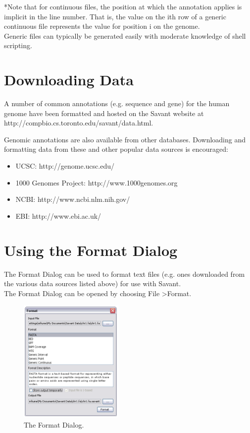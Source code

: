 \documentclass{report}
\begin{document}
*Note that for continuous files, the position at which the annotation applies is implicit in the line number. That is, the value on the ith row of a generic continuous file represents the value for position i on the genome. \\

Generic files can typically be generated easily with moderate knowledge of shell scripting.  

\section{Downloading Data}

A number of common annotations (e.g. sequence and gene) for the human genome have been formatted and hosted on the Savant website at http://compbio.cs.toronto.edu/savant/data.html.

Genomic annotations are also available from other databases. Downloading and formatting data from these and other popular data sources is encouraged:

\begin{itemize}
\item UCSC: http://genome.ucsc.edu/
\item 1000 Genomes Project: http://www.1000genomes.org
\item NCBI: http://www.ncbi.nlm.nih.gov/
\item EBI: http://www.ebi.ac.uk/
\end{itemize}

\section{Using the Format Dialog}

\label{usingformatdialog}

The Format Dialog can be used to format text files (e.g. ones downloaded from the various data sources listed above) for use with Savant. \\

The Format Dialog can be opened by choosing File \textgreater Format. \\

\begin{figure}[!h]
\begin{center}
\includegraphics[type=png,ext=.png,read=.png,height=6cm]{images/formatdialog}
\caption{The Format Dialog.}
\label{formatdialog}
\end{center}
\end{figure}
\end{document}

